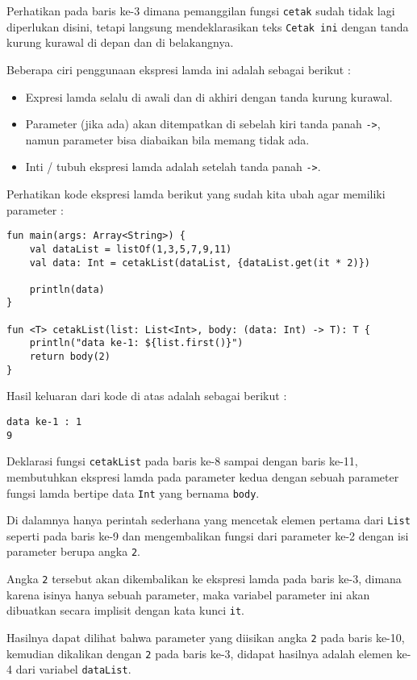 Perhatikan pada baris ke-3 dimana pemanggilan fungsi \texttt{cetak} sudah tidak lagi diperlukan disini, tetapi langsung mendeklarasikan teks \texttt{Cetak ini} dengan tanda kurung kurawal di depan dan di belakangnya.

Beberapa ciri penggunaan ekspresi lamda ini adalah sebagai berikut :

\begin{itemize}
	\item Expresi lamda selalu di awali dan di akhiri dengan tanda kurung kurawal.
	\item Parameter (jika ada) akan ditempatkan di sebelah kiri tanda panah \texttt{->}, namun parameter bisa diabaikan bila memang tidak ada.
	\item Inti / tubuh ekspresi lamda adalah setelah tanda panah \texttt{->}.
\end{itemize}

Perhatikan kode ekspresi lamda berikut yang sudah kita ubah agar memiliki parameter :

\begin{lstlisting}
fun main(args: Array<String>) {
	val dataList = listOf(1,3,5,7,9,11)
	val data: Int = cetakList(dataList, {dataList.get(it * 2)})
	
	println(data)
}

fun <T> cetakList(list: List<Int>, body: (data: Int) -> T): T {
	println("data ke-1: ${list.first()}")
	return body(2)
}
\end{lstlisting}

Hasil keluaran dari kode di atas adalah sebagai berikut :

\begin{lstlisting}
data ke-1 : 1
9
\end{lstlisting}

Deklarasi fungsi \texttt{cetakList} pada baris ke-8 sampai dengan baris ke-11, membutuhkan ekspresi lamda pada parameter kedua dengan sebuah parameter fungsi lamda bertipe data \texttt{Int} yang bernama \texttt{body}.

Di dalamnya hanya perintah sederhana yang mencetak elemen pertama dari \texttt{List} seperti pada baris ke-9 dan mengembalikan fungsi dari parameter ke-2 dengan isi parameter berupa angka \texttt{2}.

Angka \texttt{2} tersebut akan dikembalikan ke ekspresi lamda pada baris ke-3, dimana karena isinya hanya sebuah parameter, maka variabel parameter ini akan dibuatkan secara implisit dengan kata kunci \texttt{it}.

Hasilnya dapat dilihat bahwa parameter yang diisikan angka \texttt{2} pada baris ke-10, kemudian dikalikan dengan \texttt{2} pada baris ke-3, didapat hasilnya adalah elemen ke-4 dari variabel \texttt{dataList}.

